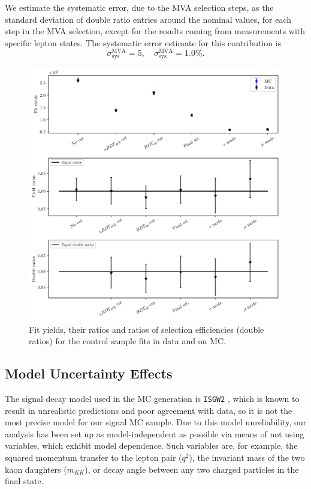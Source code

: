 We estimate the systematic error, due to the MVA selection steps, as the standard deviation of double ratio entries around the nominal values, for each step in the MVA selection, except for the results coming from measurements with specific lepton states. The systematic error estimate for this contribution is 
\begin{equation}
\sigma_{\mathrm{sys.}}^{\mathrm{MVA}} = 5,\quad\sigma_{\mathrm{sys.}}^{\mathrm{MVA}} = 1.0\%.
\end{equation}

\begin{figure}[H]
	\centering
	\captionsetup{width=0.8\linewidth}
	\includegraphics[width=\linewidth]{fig/cs_fits.pdf}
	\caption{Fit yields, their ratios and ratios of selection efficiencies (double ratios) for the control sample fits in data and on MC.}
	\label{fig:cs_fits}
\end{figure}

\subsection{Model Uncertainty Effects}
The signal decay model used in the MC generation is \texttt{ISGW2} \cite{Scora:1995ty}, which is known to result in unrealistic predictions and poor agreement with data, so it is not the most precise model for our signal MC sample. Due to this model unreliability, our analysis has been set up as model-independent as possible via means of not using variables, which exhibit model dependence. Such variables are, for example, the squared momentum transfer to the lepton pair ($q^2$), the invariant mass of the two kaon daughters ($m_{KK}$), or decay angle between any two charged particles in the final state.

